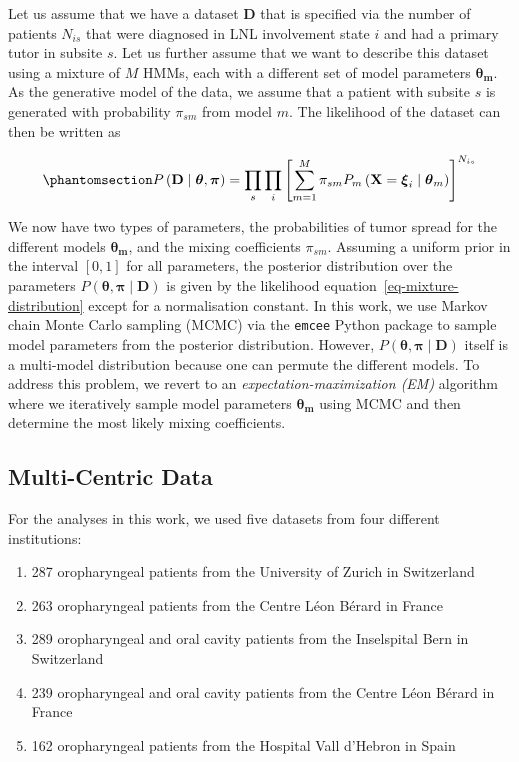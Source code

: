 \documentclass[11pt,twocolumn,twoside]{article}
\providecommand{\tightlist}{%
  \setlength{\itemsep}{0pt}\setlength{\parskip}{0pt}}\usepackage{longtable,booktabs,array}
\begin{document}
Let us assume that we have a dataset \(\mathbf{D}\) that is specified
via the number of patients \(N_{is}\) that were diagnosed in LNL
involvement state \(i\) and had a primary tutor in subsite \(s\). Let us
further assume that we want to describe this dataset using a mixture of
\(M\) HMMs, each with a different set of model parameters
\(\boldsymbol{\theta_m}\). As the generative model of the data, we
assume that a patient with subsite \(s\) is generated with probability
\(\pi_{sm}\) from model \(m\). The likelihood of the dataset can then be
written as

\begin{equation}\phantomsection\label{eq-mixture-distribution}{
P \left( \mathbf{D} \mid \boldsymbol{\theta}, \boldsymbol{\pi}\right) = \prod_s \prod_i \left[ \sum_{m=1}^M \pi_{sm} P_m \left( \mathbf{X}=\boldsymbol{\xi}_i \mid \boldsymbol{\theta}_m \right) \right]^{N_{is}}
}\end{equation}

We now have two types of parameters, the probabilities of tumor spread
for the different models \(\boldsymbol{\theta_m}\), and the mixing
coefficients \(\pi_{sm}\). Assuming a uniform prior in the interval
\([0,1]\) for all parameters, the posterior distribution over the
parameters
\(P \left( \boldsymbol{\theta}, \boldsymbol{\pi} \mid \mathbf{D} \right)\)
is given by the likelihood equation~\ref{eq-mixture-distribution} except
for a normalisation constant. In this work, we use Markov chain Monte
Carlo sampling (MCMC) via the \texttt{emcee} Python package
\autocite{foreman-mackey_emcee_2013} to sample model parameters from the
posterior distribution. However,
\(P \left( \boldsymbol{\theta}, \boldsymbol{\pi} \mid \mathbf{D} \right)\)
itself is a multi-model distribution because one can permute the
different models. To address this problem, we revert to an
\emph{expectation-maximization (EM)} algorithm where we iteratively
sample model parameters \(\boldsymbol{\theta_m}\) using MCMC and then
determine the most likely mixing coefficients.

\subsection{Multi-Centric Data}\label{multi-centric-data}

For the analyses in this work, we used five datasets from four different
institutions:

\begin{enumerate}
\def\labelenumi{\arabic{enumi}.}
\tightlist
\item
  287 oropharyngeal patients from the University of Zurich in
  Switzerland
\item
  263 oropharyngeal patients from the Centre Léon Bérard in France
\item
  289 oropharyngeal and oral cavity patients from the Inselspital Bern
  in Switzerland
\item
  239 oropharyngeal and oral cavity patients from the Centre Léon Bérard
  in France
\item
  162 oropharyngeal patients from the Hospital Vall d'Hebron in Spain
\end{enumerate}
\end{document}
